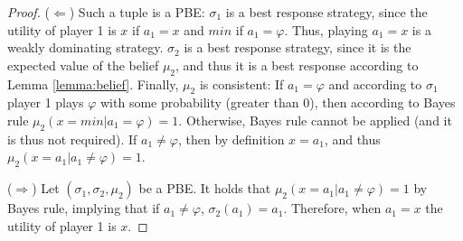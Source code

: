 \documentclass[letterpaper]{article} %
\begin{document}
\begin{proof}
($\Leftarrow$) Such a tuple is a PBE: $\sigma_1$ is a best response strategy, since the utility of player 1 is $x$ if $a_1=x$ and $min$ if $a_1=\varphi$. Thus, playing $a_1=x$ is a weakly dominating strategy. 
$\sigma_2$ is a best response strategy, since it is the expected value of the belief $\mu_2$, and thus it is a best response  according to Lemma \ref{lemma:belief}.
Finally, $\mu_2$ is consistent: 
If $a_1=\varphi$ and according to $\sigma_1$ player 1 plays $\varphi$ with some probability (greater than 0), then according to Bayes rule $\mu_2 (x=min| a_1=\varphi)=1$. Otherwise, Bayes rule cannot be applied (and it is thus not required).
If $a_1\neq \varphi$, then by definition $x=a_1$, and thus $\mu_2(x=a_1| a_1\neq \varphi)=1$.

($\Rightarrow$)
Let $(\sigma_1, \sigma_2, \mu_2)$ be a PBE.
It holds  that $\mu_2(x=a_1| a_1\neq \varphi) = 1$ by Bayes rule, implying that if $a_1\neq\varphi$, $\sigma_2(a_1)=a_1$. Therefore, when $a_1=x$ the utility of player 1 is $x$. %


\end{proof}
\end{document}
